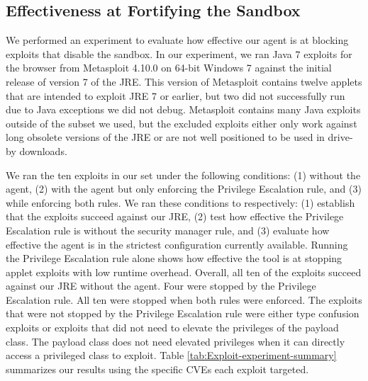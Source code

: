 \documentclass{sig-alternate}
\begin{document}
\subsection{Effectiveness at Fortifying the Sandbox}\label{sub:Effectiveness-at-Fortifying}

We performed an experiment to evaluate how effective our agent is
at blocking exploits that disable the sandbox. In our experiment,
we ran Java 7 exploits for the browser from Metasploit 4.10.0 on 64-bit
Windows 7 against the initial release of version 7 of the JRE. This
version of Metasploit contains twelve applets that are intended to
exploit JRE 7 or earlier, but two did not successfully run due to
Java exceptions we did not debug. Metasploit contains many Java exploits
outside of the subset we used, but the excluded exploits either only
work against long obsolete versions of the JRE or are not well positioned
to be used in drive-by downloads. 

We ran the ten exploits in our set under the following conditions:
(1) without the agent, (2) with the agent but only enforcing the Privilege
Escalation rule, and (3) while enforcing both rules. We ran these
conditions to respectively: (1) establish that the exploits succeed
against our JRE, (2) test how effective the Privilege Escalation rule
is without the security manager rule, and (3) evaluate how effective
the agent is in the strictest configuration currently available. Running
the Privilege Escalation rule alone shows how effective the tool is
at stopping applet exploits with low runtime overhead. Overall, all
ten of the exploits succeed against our JRE without the agent. Four
were stopped by the Privilege Escalation rule. All ten were stopped
when both rules were enforced. The exploits that were not stopped
by the Privilege Escalation rule were either type confusion exploits
or exploits that did not need to elevate the privileges of the payload
class. The payload class does not need elevated privileges when it
can directly access a privileged class to exploit. Table \ref{tab:Exploit-experiment-summary}
summarizes our results using the specific CVEs each exploit targeted.
\end{document}
